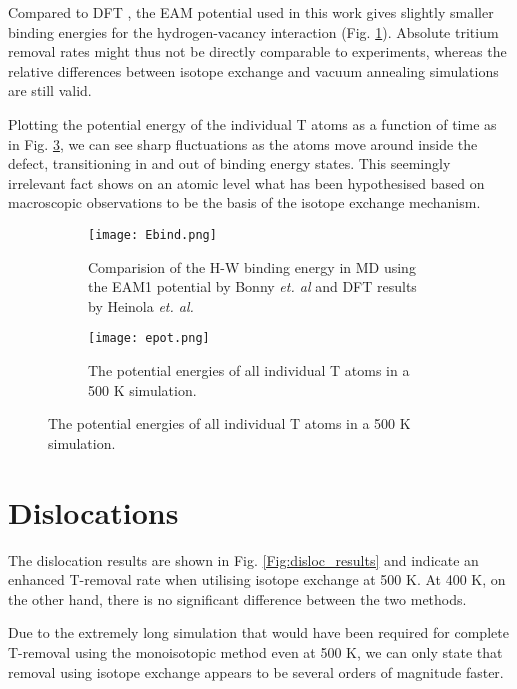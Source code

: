 Compared to DFT \cite{heinolaTungstenDFT}, the EAM potential used in this work gives slightly smaller binding energies for the hydrogen-vacancy interaction (Fig. \ref{Fig:Ebind1H_DFT}). 
Absolute tritium removal rates might thus not be directly comparable to experiments, whereas the relative differences between isotope exchange and vacuum annealing simulations are still valid.

Plotting the potential energy of the individual T atoms as a function of time as in Fig. \ref{Fig:Epot}, we can see sharp fluctuations as the atoms move around inside the defect, transitioning in and out of binding energy states.
This seemingly irrelevant fact shows on an atomic level what has been hypothesised based on macroscopic observations to be the basis of the isotope exchange mechanism.

\begin{figure}[!ht]
\begin{subfigure}{.48\textwidth}
	\center
	\texttt{[image: Ebind.png]}
	\caption{Comparision of the H-W binding energy in MD using the EAM1 potential by Bonny \textit{et. al} and DFT results by Heinola \textit{et. al. }\cite{heinolaTungstenDFT}}
	\label{Fig:Ebind1H_DFT}
\end{subfigure}
\hspace{3mm}
\begin{subfigure}{.48\textwidth}
	\center
	\texttt{[image: epot.png]}
	\caption{The potential energies of all individual T atoms in a 500 K simulation.\vspace*{6mm}}
	\label{Fig:Epot}
\end{subfigure}
\end{figure}


\section{Dislocations}
The dislocation results are shown in Fig. \ref{Fig:disloc_results} and indicate an enhanced T-removal rate when utilising isotope exchange at 500 K. 
At 400 K, on the other hand, there is no significant difference between the two methods.

Due to the extremely long simulation that would have been required for complete T-removal using the monoisotopic method even at 500 K, we can only state that removal using isotope exchange appears to be several orders of magnitude faster.


